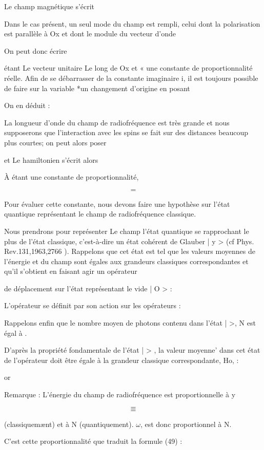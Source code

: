 Le champ magnétique  s'écrit

Dans le cas présent, un seul mode du champ est rempli, celui dont la polarisation
est parallèle à Ox et dont le module du vecteur d'onde

On peut donc écrire

étant Le vecteur unitaire Le long de Ox et « une constante de proportionnalité
réelle. Afin de se débarrasser de la constante imaginaire i, il est toujours
possible de faire sur la variable *un changement d'origine en posant

On en déduit :

La longueur d'onde du champ de radiofréquence est très grande et nous supposerons
que l'interaction avec les spins se fait sur des distances beaucoup plus courtes;
 on peut alors poser 

et 
Le hamiltonien  s'écrit alors

À étant une constante de proportionnalité,


\[
\tag{49}=
\]

Pour évaluer cette constante, nous devons faire une hypothèse sur
l'état quantique représentant le champ de radiofréquence classique.

Nous prendrons pour représenter Le champ l'état quantique se rapprochant le plus de l'état classique, c'est-à-dire un état cohérent de
Glauber | y > (cf Phys. Rev.131,1963,2766 ). Rappelons que cet état est tel
que les valeurs moyennes de l'énergie et du champ sont égales aux grandeurs
classiques correspondantes et qu'il s'obtient en faisant agir un opérateur

de déplacement  sur l'état représentant le vide | O > :

L'opérateur  se définit par son action sur les opérateurs  :

Rappelons enfin que le nombre moyen de photons contenu dans l'état |  >,
N est égal à .

D'après la propriété fondamentale de l'état |  > , la valeur moyenne’ dans cet état de
l'opérateur  doit être égale à la grandeur classique correspondante, Ho, :

or

Remarque : L'énergie du champ de radiofréquence est proportionnelle à y

\[
\tag{50-a}=
\]
\[
\tag{50-b}=
\]

(classiquemænt) et à N (quantiquement). $\omega$, est donc proportionnel à N.

C'est cette proportionnalité que traduit la formule (49) :

